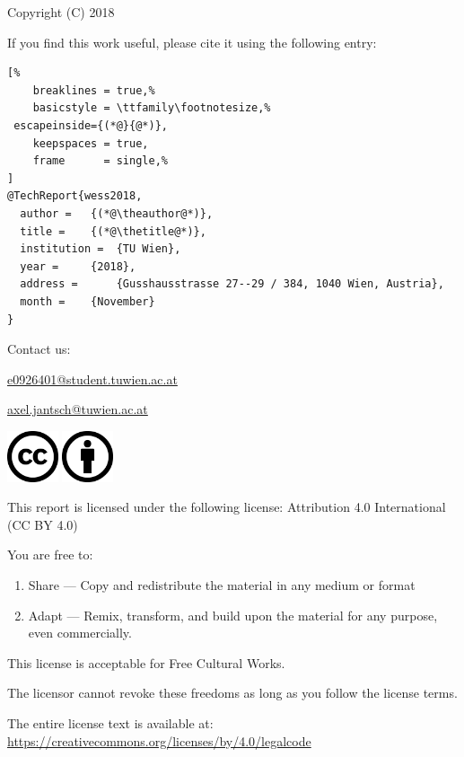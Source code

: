 Copyright (C) 2018 \theauthor

If you find this work useful, please cite it using the following \BibTeX{ } entry:

\vspace{1em}

\begin{lstlisting}[%
	breaklines = true,%
	basicstyle = \ttfamily\footnotesize,%
 escapeinside={(*@}{@*)},
	keepspaces = true,
	frame      = single,%
]
@TechReport{wess2018,
  author = 	 {(*@\theauthor@*)},
  title = 	 {(*@\thetitle@*)},
  institution =  {TU Wien},
  year = 	 {2018},
  address = 	 {Gusshausstrasse 27--29 / 384, 1040 Wien, Austria},
  month = 	 {November}
}
\end{lstlisting}

\vspace{3em}
Contact us:

\href{E-mail address}{e0926401@student.tuwien.ac.at}

\href{E-mail address}{axel.jantsch@tuwien.ac.at}


\vfill

\includegraphics[height=1.5cm]{fig/cc-large.png}
\includegraphics[height=1.5cm]{fig/by-large.png}


This report is licensed under the following license:
Attribution 4.0 International (CC BY 4.0)

\vspace{3em}

You are free to:

\begin{enumerate}
   \item Share --- Copy and redistribute the material in any medium or format
   \item Adapt --- Remix, transform, and build upon the material for any purpose,
			even commercially.
\end{enumerate}

This license is acceptable for Free Cultural Works.

The licensor cannot revoke these freedoms as long as you follow the license terms.

The entire license text is available at:
\href{https://creativecommons.org/licenses/by/4.0/legalcode}
	{https://creativecommons.org/licenses/by/4.0/legalcode}


